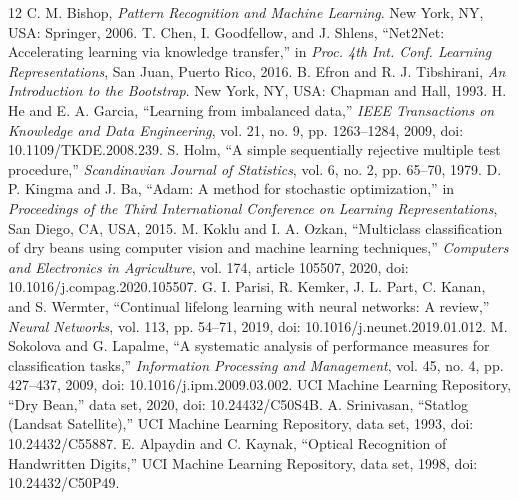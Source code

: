 \documentclass[conference,10pt]{IEEEtran}
\begin{document}
\clearpage
{}
\begin{thebibliography}{12}
C. M. Bishop, \emph{Pattern Recognition and Machine Learning}. New York, NY, USA: Springer, 2006.
T. Chen, I. Goodfellow, and J. Shlens, ``Net2Net: Accelerating learning via knowledge transfer,'' in \emph{Proc. 4th Int. Conf. Learning Representations}, San Juan, Puerto Rico, 2016.
B. Efron and R. J. Tibshirani, \emph{An Introduction to the Bootstrap}. New York, NY, USA: Chapman and Hall, 1993.
H. He and E. A. Garcia, ``Learning from imbalanced data,'' \emph{IEEE Transactions on Knowledge and Data Engineering}, vol. 21, no. 9, pp. 1263--1284, 2009, doi: 10.1109/TKDE.2008.239.
S. Holm, ``A simple sequentially rejective multiple test procedure,'' \emph{Scandinavian Journal of Statistics}, vol. 6, no. 2, pp. 65--70, 1979.
D. P. Kingma and J. Ba, ``Adam: A method for stochastic optimization,'' in \emph{Proceedings of the Third International Conference on Learning Representations}, San Diego, CA, USA, 2015.
M. Koklu and I. A. Ozkan, ``Multiclass classification of dry beans using computer vision and machine learning techniques,'' \emph{Computers and Electronics in Agriculture}, vol. 174, article 105507, 2020, doi: 10.1016/j.compag.2020.105507.
G. I. Parisi, R. Kemker, J. L. Part, C. Kanan, and S. Wermter, ``Continual lifelong learning with neural networks: A review,'' \emph{Neural Networks}, vol. 113, pp. 54--71, 2019, doi: 10.1016/j.neunet.2019.01.012.
M. Sokolova and G. Lapalme, ``A systematic analysis of performance measures for classification tasks,'' \emph{Information Processing and Management}, vol. 45, no. 4, pp. 427--437, 2009, doi: 10.1016/j.ipm.2009.03.002.
UCI Machine Learning Repository, ``Dry Bean,'' data set, 2020, doi: 10.24432/C50S4B.
A. Srinivasan, ``Statlog (Landsat Satellite),'' UCI Machine Learning Repository, data set, 1993, doi: 10.24432/C55887.
E. Alpaydin and C. Kaynak, ``Optical Recognition of Handwritten Digits,'' UCI Machine Learning Repository, data set, 1998, doi: 10.24432/C50P49.
\end{thebibliography}
\end{document}
